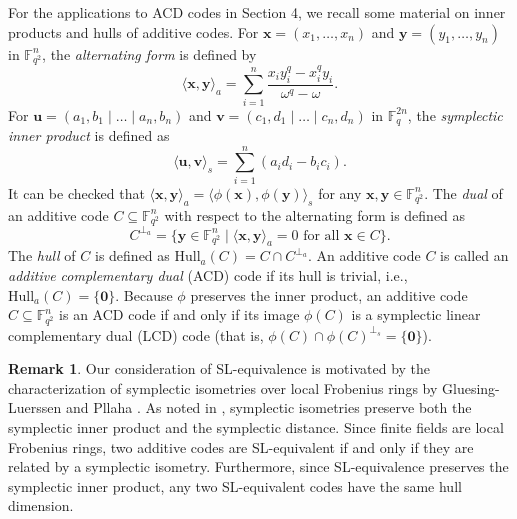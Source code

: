 \documentclass[10pt,a4paper]{amsart}
\theoremstyle{plain}
\theoremstyle{definition}
\newtheorem{remark}{Remark}
\begin{document}
For the applications to ACD codes in Section 4, we recall some material on inner products and hulls of additive codes. 
For $\mathbf{x} = (x_1, \dots, x_n)$ and $\mathbf{y} = (y_1, \dots, y_n)$ in $\mathbb{F}_{q^2}^n$, the \textit{alternating form} is defined by
\begin{equation*}
\langle \mathbf{x}, \mathbf{y} \rangle_a = \sum_{i=1}^n \frac{x_i y_i^q - x_i^q y_i}{\omega^q - \omega}.
\end{equation*}
For $\mathbf{u} = (a_1, b_1 \mid \dots \mid a_n, b_n)$ and $\mathbf{v} = (c_1, d_1 \mid \dots \mid c_n, d_n)$ in $\mathbb{F}_q^{2n}$, the \textit{symplectic inner product} is defined as
\begin{equation*}
\langle \mathbf{u}, \mathbf{v} \rangle_s = \sum_{i=1}^n (a_i d_i - b_i c_i).
\end{equation*}
It can be checked that $\langle \mathbf{x}, \mathbf{y} \rangle_a = \langle \phi(\mathbf{x}), \phi(\mathbf{y}) \rangle_s$ for any $\mathbf{x}, \mathbf{y} \in \mathbb{F}_{q^2}^n$. 
The \textit{dual} of an additive code $C \subseteq \mathbb{F}_{q^2}^n$ with respect to the alternating form is defined as
\begin{equation*}
C^{\perp_a} = \{ \mathbf{y} \in \mathbb{F}_{q^2}^n \mid \langle \mathbf{x}, \mathbf{y} \rangle_a = 0 \text{ for all } \mathbf{x} \in C \}.
\end{equation*}
The \textit{hull} of $C$ is defined as $\mathrm{Hull}_a(C) = C \cap C^{\perp_a}$. An additive code $C$ is called an \textit{additive complementary dual} (ACD) code if its hull is trivial, i.e., $\mathrm{Hull}_a(C) = \{\mathbf{0}\}$. Because $\phi$ preserves the inner product, an additive code $C \subseteq \mathbb{F}_{q^2}^n$ is an ACD code if and only if its image $\phi(C)$ is a symplectic linear complementary dual (LCD) code (that is, $\phi(C) \cap \phi(C)^{\perp_s} = \{\mathbf{0}\}$).

\begin{remark} \label{remarkSLhull}
Our consideration of \textrm{SL}-equivalence is motivated by the characterization of symplectic isometries over local Frobenius rings by Gluesing-Luerssen and Pllaha \cite[Theorem 7.1]{gluesing2019}. As noted in \cite[Section 7]{gluesing2019}, symplectic isometries preserve both the symplectic inner product and the symplectic distance. Since finite fields are local Frobenius rings, two additive codes are \textrm{SL}-equivalent if and only if they are related by a symplectic isometry.
Furthermore, since \textrm{SL}-equivalence   preserves the symplectic inner product, any two \textrm{SL}-equivalent codes have the same hull dimension.  
\end{remark}
 
\end{document}
